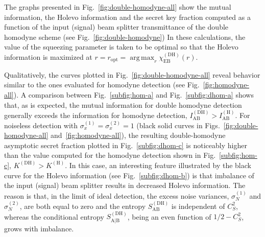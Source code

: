 \documentclass[%
reprint,
superscriptaddress,
 amsmath,amssymb,amsfonts,
 aps,
 pra,
 longbibliography
]{revtex4-2}
\newcommand{\ind}[1]{\mathrm{#1}}
\DeclareMathOperator*{\argmax}{arg\,max}
\begin{document}


The graphs presented in Fig.~\ref{fig:double-homodyne-all}
show the mutual information, the Holevo information
and the secret key fraction
computed as a function
of the input (signal) beam splitter transmittance
of the double homodyne scheme (see Fig.~\ref{fig:double-homodyne})
In these calculations,
the value of the squeezing parameter is taken to be optimal
so that the Holevo information is maximized at
$r=r_{\ind{opt}}=\argmax_r\chi_{\ind{EB}}^{(\ind{DH})}(r)$. 

Qualitatively,
the curves plotted in Fig.~\ref{fig:double-homodyne-all}
reveal behavior similar to
the ones evaluated for homodyne detection (see Fig.~\ref{fig:homodyne-all}). 
A comparison between Fig.~\ref{subfig:hom-a}
and Fig.~\ref{subfig:dhom-a} shows that, as is expected,
the mutual information for double homodyne detection 
generally exceeds the information for homodyne detection,
$I_{\ind{AB}}^{(\ind{DH})}>I_{\ind{AB}}^{(\ind{H})}$.
For noiseless detection with $\sigma_x^{(1)}=\sigma_x^{(2)}=1$
(black solid curves in Figs.~\ref{fig:double-homodyne-all} and~\ref{fig:homodyne-all}),
the resulting double-homodyne asymptotic secret fraction plotted in Fig.~\ref{subfig:dhom-c}
is noticeably higher than  the value computed for
the homodyne detection shown in Fig.~\ref{subfig:hom-c},
$K^{(\ind{DH})}>K^{(\ind{H})}$.
In this case, 
an interesting feature illustrated
by the black curve for the Holevo information
(see Fig.~\ref{subfig:dhom-b})
is that imbalance of the input (signal) beam splitter
results in decreased Holevo information.
The reason is that, in the limit of ideal detection,
the excess noise variances, $\sigma_{N}^{(1)}$ and
$\sigma_{N}^{(2)}$, are both equal to zero
and the entropy $S_{\ind{AB}}^{(\ind{DH})}$ is independent of $C_S^2$,
whereas the conditional entropy $S_{\ind{A|B}}^{(\ind{DH})}$,
being an even function of $1/2-C_S^2$,
grows with imbalance.
\end{document}

